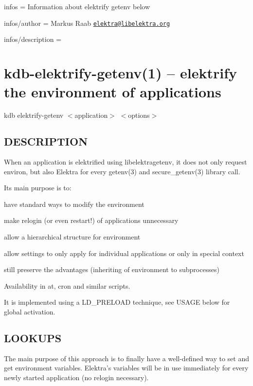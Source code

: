 
\begin{DoxyItemize}
\item infos = Information about elektrify getenv below
\item infos/author = Markus Raab \href{mailto:elektra@libelektra.org}{\tt elektra@libelektra.\+org}
\item infos/description =
\end{DoxyItemize}

\section*{kdb-\/elektrify-\/getenv(1) -- elektrify the environment of applications }

{\ttfamily kdb elektrify-\/getenv} $<$application$>$ $<$options$>$

\subsection*{D\+E\+S\+C\+R\+I\+P\+T\+I\+O\+N}

When an application is elektrified using libelektragetenv, it does not only request {\ttfamily environ}, but also Elektra for every getenv(3) and secure\+\_\+getenv(3) library call.

Its main purpose is to\+:


\begin{DoxyItemize}
\item have standard ways to modify the environment
\item make relogin (or even restart!) of applications unnecessary
\item allow a hierarchical structure for environment
\item allow settings to only apply for individual applications or only in special context
\item still preserve the advantages (inheriting of environment to subprocesses)
\item Availability in at, cron and similar scripts.
\end{DoxyItemize}

It is implemented using a L\+D\+\_\+\+P\+R\+E\+L\+O\+A\+D technique, see U\+S\+A\+G\+E below for global activation.

\subsection*{L\+O\+O\+K\+U\+P\+S}

The main purpose of this approach is to finally have a well-\/defined way to set and get environment variables. Elektra's variables will be in use immediately for every newly started application (no relogin necessary).

